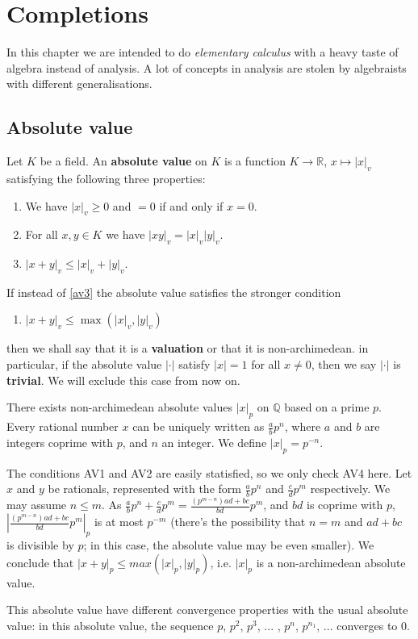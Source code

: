 \chapter{Completions}
	In this chapter we are intended to do \textit{elementary calculus} with a heavy taste of algebra instead of analysis. A lot of concepts in analysis are stolen by algebraists with different generalisations.
	\section{Absolute value}
		Let $K$ be a field. An \textbf{absolute value} on $K$ is a function $K \to \mathbb{R}$, $x \mapsto |x|_v$ satisfying the following three properties:
		\begin{enumerate}[start=1,label={\bfseries AV \arabic*}]
			\item We have $|x|_v \ge 0$ and $=0$ if and only if $x = 0$.
			\item For all $x,y \in K$ we have $|xy|_v = |x|_v|y|_v$.
			\item $|x+y|_v \le |x|_v + |y|_v$. \label{av3}
		\end{enumerate}
	
		If instead of \ref{av3} the absolute value satisfies the stronger condition
		\begin{enumerate}[start=4,label={\bfseries AV \arabic*}]
			\item $|x+y|_v \le \max(|x|_v,|y|_v)$
		\end{enumerate}
		then we shall say that it is a \textbf{valuation} or that it is non-archimedean. in particular, if the absolute value $|\cdot|$ satisfy $|x|=1$ for all $x \ne 0$, then we say $|\cdot|$ is \textbf{trivial}. We will exclude this case from now on. 
		
		\begin{example}
		 There exists non-archimedean absolute values $|x|_p$ on $\mathbb{Q}$ based on a prime $p$. Every rational number $x$ can be uniquely written as $\frac{a}{b} p^n$, where $a$ and $b$ are integers coprime with $p$, and $n$ an integer. We define $|x|_p=p^{-n}$.
		 
		 The conditions AV1 and AV2 are easily statisfied, so we only check AV4 here. Let $x$ and $y$ be rationals, represented with the form $\frac{a}{b} p^n$ and $\frac{c}{d} p^m$ respectively. We may assume $n \le m$. As $\frac{a}{b} p^n +\frac{c}{d} p^m = \frac{(p^{m-n})ad+bc}{bd} p^m$, and $bd$ is coprime with $p$, $|\frac{(p^{m-n})ad+bc}{bd} p^m|_p$ is at most $p^{-m}$ (there's the possibility that $n=m$ and $ad+bc$ is divisible by $p$; in this case, the absolute value may be even smaller). We conclude that $|x+y|_p \le max(|x|_p,|y|_p)$, i.e. $|x|_p$ is a non-archimedean absolute value. 
		 
		 This absolute value have different convergence properties with the usual absolute value: in this absolute value, the sequence $p$, $p^2$, $p^3$, ... , $p^n$, $p^{n_1}$, ... converges to $0$. 
		\end{example}
		

